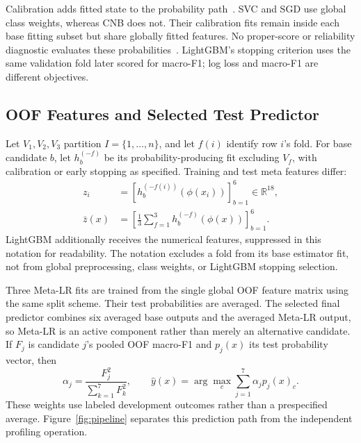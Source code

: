 \documentclass[doublecolumn]{ijcvsplatex}
\begin{document}
Calibration adds fitted state to the probability path~\cite{niculescumizil2005probabilities}. SVC and SGD use global class weights, whereas CNB does not. Their calibration fits remain inside each base fitting subset but share globally fitted features. No proper-score or reliability diagnostic evaluates these probabilities~\cite{vaicenavicius2019calibration}. LightGBM's stopping criterion uses the same validation fold later scored for macro-F1; log loss and macro-F1 are different objectives.

\subsection{OOF Features and Selected Test Predictor}
Let $V_1,V_2,V_3$ partition $I=\{1,\ldots,n\}$, and let $f(i)$ identify row $i$'s fold. For base candidate $b$, let $h_b^{(-f)}$ be its probability-producing fit excluding $V_f$, with calibration or early stopping as specified. Training and test meta features differ:
\begin{equation}
\begin{aligned}
z_i&=\left[h_b^{(-f(i))}(\phi(x_i))\right]_{b=1}^{6}\in\mathbb{R}^{18},\\
\bar z(x)&=\left[\frac{1}{3}\sum_{f=1}^{3}h_b^{(-f)}(\phi(x))\right]_{b=1}^{6}.
\end{aligned}
\end{equation}
LightGBM additionally receives the numerical features, suppressed in this notation for readability. The notation excludes a fold from its base estimator fit, not from global preprocessing, class weights, or LightGBM stopping selection.

Three Meta-LR fits are trained from the single global OOF feature matrix using the same split scheme. Their test probabilities are averaged. The selected final predictor combines six averaged base outputs and the averaged Meta-LR output, so Meta-LR is an active component rather than merely an alternative candidate. If $F_j$ is candidate $j$'s pooled OOF macro-F1 and $p_j(x)$ its test probability vector, then
\begin{equation}
\alpha_j=\frac{F_j^2}{\sum_{k=1}^{7}F_k^2},\qquad
\hat y(x)=\arg\max_c\sum_{j=1}^{7}\alpha_j p_j(x)_c.
\label{eq:ensemble}
\end{equation}
These weights use labeled development outcomes rather than a prespecified average. Figure~\ref{fig:pipeline} separates this prediction path from the independent profiling operation.
\end{document}
